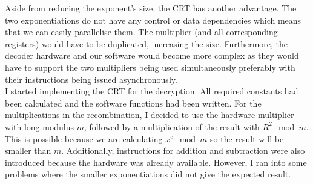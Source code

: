 \documentclass[a4paper]{article}
\begin{document}
Aside from reducing the exponent's size, the CRT has another advantage. The two exponentiations do not have any control or data dependencies which means that we can easily parallelise them. The multiplier (and all corresponding registers) would have to be duplicated, increasing the size. Furthermore, the decoder hardware and our software would become more complex as they would have to support the two multipliers being used simultaneously preferably with their instructions being issued asynchronously.\\

I started implementing the CRT for the decryption. All required constants had been calculated and the software functions had been written. For the multiplications in the recombination, I decided to use the hardware multiplier with long modulus $m$, followed by a multiplication of the result with $R^2\mod{m}$. This is possible because we are calculating $x^e\mod{m}$ so the result will be smaller than $m$. Additionally, instructions for addition and subtraction were also introduced because the hardware was already available. However, I ran into some problems where the smaller exponentiations did not give the expected result.
\end{document}
